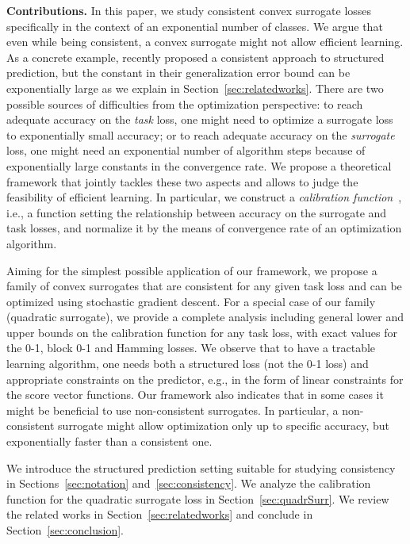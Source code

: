 \documentclass{article}
\begin{document}
\textbf{Contributions.} In this paper, we study consistent convex surrogate losses specifically in the context of an exponential number of classes. 
%
We argue that even while being consistent, a convex surrogate might not allow efficient learning.
As a concrete example, \citet{ciliberto16} recently proposed a consistent approach to structured prediction, but the constant in their generalization error bound can be exponentially large as we explain in Section~\ref{sec:relatedworks}.
There are two possible sources of difficulties from the optimization perspective: to reach adequate accuracy on the \emph{task} loss, one might need to optimize a surrogate loss to exponentially small accuracy; or to reach adequate accuracy on the \emph{surrogate} loss, one might need an exponential number of algorithm steps because of exponentially large constants in the convergence rate.
We propose a theoretical framework that jointly tackles these two aspects and allows to judge the feasibility of efficient learning.
In particular, we construct a \emph{calibration function}~\cite{steinwart07}, i.e., a function setting the relationship between accuracy on the surrogate and task losses, and normalize it by the means of convergence rate of an optimization algorithm.\vspace{-0.5mm}

Aiming for the simplest possible application of our framework, we propose a family of convex surrogates that are consistent for any given task loss and can be optimized using stochastic gradient descent.
For a special case of our family (quadratic surrogate), we provide a complete analysis including general lower and upper bounds on the calibration function for any task loss, with exact values for the 0-1, block 0-1 and Hamming losses.
We observe that to have a tractable learning algorithm, one needs both a structured loss (not the 0-1 loss) and appropriate constraints on the predictor, e.g., in the form of linear constraints for the score vector functions.
Our framework also indicates that in some cases it might be beneficial to use non-consistent surrogates.
In particular, a non-consistent surrogate might allow optimization only up to specific accuracy, but exponentially faster than a consistent one.\vspace{-0.5mm}
%


%
%
%
%
%
%
%
%

We introduce the structured prediction setting suitable for studying consistency in Sections~\ref{sec:notation} and~\ref{sec:consistency}. We analyze the calibration function for the quadratic surrogate loss in Section~\ref{sec:quadrSurr}. We review the related works in Section~\ref{sec:relatedworks} and conclude in Section~\ref{sec:conclusion}. 
%
\end{document}
